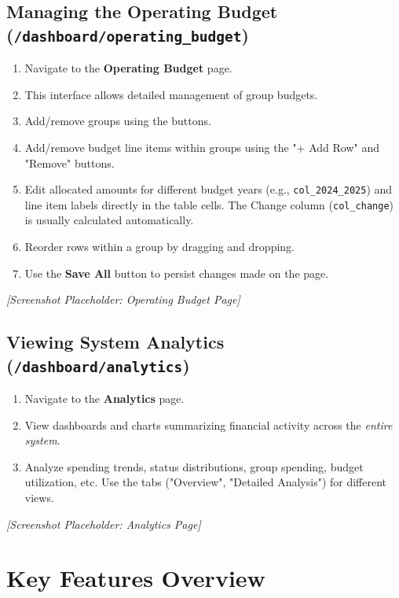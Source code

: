 \documentclass{article}
\begin{document}
\subsection{Managing the Operating Budget (\texttt{/dashboard/operating\_budget})}
\begin{enumerate}
    \item Navigate to the \textbf{Operating Budget} page.
    \item This interface allows detailed management of group budgets.
    \item Add/remove groups using the buttons.
    \item Add/remove budget line items within groups using the "+ Add Row" and "Remove" buttons.
    \item Edit allocated amounts for different budget years (e.g., \texttt{col\_2024\_2025}) and line item labels directly in the table cells. The Change column (\texttt{col\_change}) is usually calculated automatically.
    \item Reorder rows within a group by dragging and dropping.
    \item Use the \textbf{Save All} button to persist changes made on the page.
\end{enumerate}
\textit{[Screenshot Placeholder: Operating Budget Page]}

\subsection{Viewing System Analytics (\texttt{/dashboard/analytics})}
\begin{enumerate}
    \item Navigate to the \textbf{Analytics} page.
    \item View dashboards and charts summarizing financial activity across the \textit{entire system}.
    \item Analyze spending trends, status distributions, group spending, budget utilization, etc. Use the tabs ("Overview", "Detailed Analysis") for different views.
\end{enumerate}
\textit{[Screenshot Placeholder: Analytics Page]}

\section{Key Features Overview}
\end{document}
